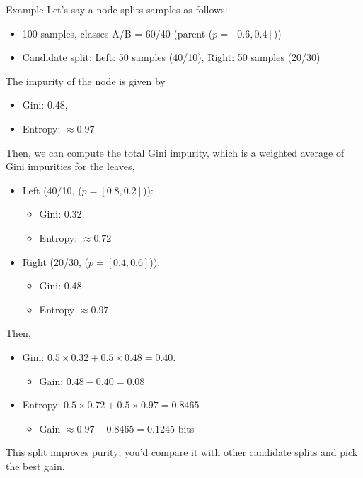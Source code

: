 \begin{commentbox}{Example}
Let's say a node splits samples as follows:
	\begin{itemize}
		\item 100 samples, classes A/B = 60/40 (parent ($p=[0.6,0.4]$))
		\item Candidate split:  Left: 50 samples (40/10), Right: 50 samples (20/30)
	\end{itemize}
The impurity of the node is given by 
\begin{itemize}
	\item Gini: 0.48, 
	\item Entropy: $\approx 0.97$
\end{itemize}

Then, we can compute the total Gini impurity, which is a weighted average of Gini impurities for the leaves, 
\begin{itemize}
	\item Left (40/10, ($p=[0.8,0.2]$)): 
		\begin{itemize}
			\item Gini: 0.32, 
			\item Entropy: $\approx 0.72$
		\end{itemize}
	\item Right (20/30, ($p=[0.4,0.6]$)): 
		\begin{itemize}
			\item Gini: 0.48
			\item Entropy $\approx 0.97$
		\end{itemize}
\end{itemize}

Then, 
\begin{itemize}
	\item Gini: $0.5\times0.32 + 0.5\times0.48 = 0.40$. 
		\begin{itemize}
			\item Gain: $0.48 - 0.40 = 0.08$
		\end{itemize}
	\item Entropy: $0.5\times0.72 + 0.5\times0.97 = 0.8465$
		\begin{itemize}
			\item Gain $\approx 0.97 - 0.8465 = 0.1245$ bits
		\end{itemize}
\end{itemize}
This split improves purity; you'd compare it with other candidate splits and pick the best gain.
	
\end{commentbox}


